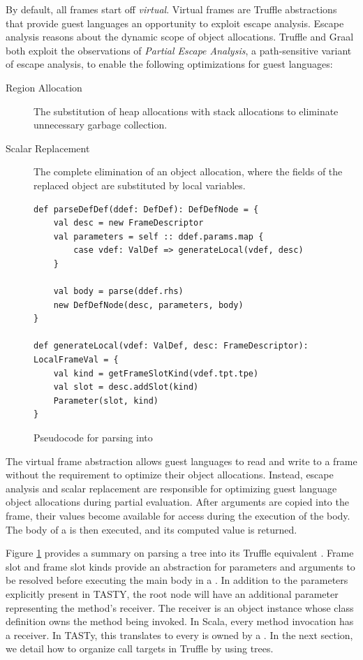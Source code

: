 By default, all frames start off \textit{virtual}.
Virtual frames are Truffle abstractions that provide guest languages an opportunity to exploit escape analysis.
Escape analysis\cite{escape-analysis} reasons about the dynamic scope of object allocations. 
Truffle and Graal both exploit the observations of \textit{Partial Escape Analysis}\cite{java:partial-escape-analysis}, a path-sensitive variant of escape analysis, to enable the following optimizations for guest languages:

\begin{description}
	\item[Region Allocation\cite{java:escape-analysis,tofte:region-memory}] The substitution of heap allocations with stack allocations to eliminate unnecessary garbage collection.
	\item[Scalar Replacement\cite{java:escape-analysis-optimizations}] The complete elimination of an object allocation, where the fields of the replaced object are substituted by local variables.
\end{description}

\begin{figure}[!htb]
\begin{verbatim}
def parseDefDef(ddef: DefDef): DefDefNode = {
	val desc = new FrameDescriptor
	val parameters = self :: ddef.params.map {
		case vdef: ValDef => generateLocal(vdef, desc)
	}
		
	val body = parse(ddef.rhs)
	new DefDefNode(desc, parameters, body)
}
	
def generateLocal(vdef: ValDef, desc: FrameDescriptor): LocalFrameVal = {
	val kind = getFrameSlotKind(vdef.tpt.tpe)
	val slot = desc.addSlot(kind)
	Parameter(slot, kind)
}
\end{verbatim}
\caption{Pseudocode for parsing  into }
\label{impl:parse-defdef}
\end{figure}

The virtual frame abstraction allows guest languages to read and write to a frame without the requirement to optimize their object allocations.
Instead, escape analysis and scalar replacement are responsible for optimizing guest language object allocations during partial evaluation. 
After arguments are copied into the frame, their values become available for access during the execution of the body.
The body of a  is then executed, and its computed value is returned.

Figure \ref{impl:parse-defdef} provides a summary on parsing a  tree into its Truffle equivalent .
Frame slot and frame slot kinds provide an abstraction for parameters and arguments to be resolved before executing the main body in a .
In addition to the parameters explicitly present in TASTY, the root node will have an additional parameter representing the method's receiver.
The receiver is an object instance whose class definition owns the method being invoked.
In Scala, every method invocation has a receiver.
In TASTy, this translates to every  is owned by a .
In the next section, we detail how to organize call targets in Truffle by using  trees.


